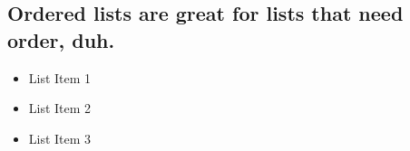 \subsection*{ Ordered lists are great for lists that need order, duh. }

\begin{itemize}                \item List Item 1             \item List Item 2             \item List Item 3          \end{itemize}